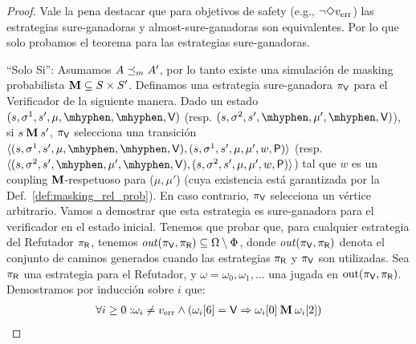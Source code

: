 \noindent
\noindent
\begin{proof} 
 Vale la pena destacar que para objetivos de safety (e.g., $\neg \Diamond v_{\text{err}}$) las estrategias sure-ganadoras y almost-sure-ganadoras son equivalentes. Por lo que solo probamos el teorema para las estrategias sure-ganadoras.
  
\noindent ``Solo Si'': Asumamos $A \preceq_{m} A'$, por lo tanto existe una simulación de masking probabilista $\mathbin{\mathbf{M}} \subseteq S \times S'$.
Definamos una estrategia sure-ganadora  $\pi_{\mathsf{V}}$ para el Verificador de la siguiente manera.
Dado un estado $(s, \sigma^1, s', \mu, \mhyphen, \mhyphen, \Verifier)$ (resp. $(s, \sigma^2, s', \mhyphen, \mu', \mhyphen, \Verifier)$), si $s \mathbin{\mathbf{M}}  s'$, $\pi_{\mathsf{V}}$ selecciona una transición
$\langle (s, \sigma^1, s', \mu, \mhyphen, \mhyphen, \Verifier), (s, \sigma^1, s', \mu, \mu', w, \Probabilistic)\rangle$ (resp. $\langle (s, \sigma^2, s', \mhyphen, \mu', \mhyphen, \Verifier),(s, \sigma^2, s', \mu, \mu', w, \Probabilistic)\rangle$) tal que $w$ es un coupling $\mathbin{\mathbf{M}}$-respetuoso para ($\mu,\mu'$) 
(cuya existencia está garantizada por la Def.~\ref{def:masking_rel_prob}). En caso contrario, $\pi_{\mathsf{V}}$ selecciona un vértice arbitrario. 
Vamos a demostrar que esta estrategia es sure-ganadora para el verificador en el estado inicial.
Tenemos que probar que, para cualquier estrategia del Refutador $\pi_{\mathsf{R}}$, tenemos $\mathit{out}(\pi_{\mathsf{V}}, \pi_{\mathsf{R}}) \subseteq\Omega \setminus \Phi$, donde $\mathit{out}(\pi_{\mathsf{V}}, \pi_{\mathsf{R}})$ denota el conjunto de caminos generados cuando las estrategias $\pi_{\mathsf{R}}$ y $\pi_{\mathsf{V}}$ son utilizadas.  Sea $\pi_{\mathsf{R}}$ una estrategia para el Refutador, y $\omega = \omega_0, \omega_1,  \dots$ una jugada en $\text{out}(\pi_{\mathsf{V}}, \pi_{\mathsf{R}})$. 
Demostramos por inducción sobre $i$ que:
\begin{align} 
\forall i \geq 0: & \omega_i \neq \ErrorSt \wedge (\pr{6}{\omega_i} = \Verifier \Rightarrow \pr{0}{\omega_i} \M  \pr{2}{\omega_i}) \nonumber \\ 

\end{align}
\end{proof}
